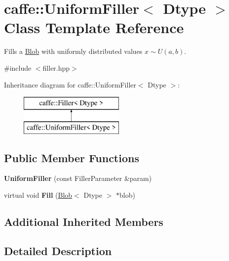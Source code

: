 \hypertarget{classcaffe_1_1UniformFiller}{}\section{caffe\+:\+:Uniform\+Filler$<$ Dtype $>$ Class Template Reference}
\label{classcaffe_1_1UniformFiller}


Fills a \hyperlink{classcaffe_1_1Blob}{Blob} with uniformly distributed values $ x\sim U(a, b) $.  




{\ttfamily \#include $<$filler.\+hpp$>$}

Inheritance diagram for caffe\+:\+:Uniform\+Filler$<$ Dtype $>$\+:\begin{figure}[H]
\begin{center}
\leavevmode
\includegraphics[height=2.000000cm]{classcaffe_1_1UniformFiller}
\end{center}
\end{figure}
\subsection*{Public Member Functions}
\begin{DoxyCompactItemize}
\item 
{\bfseries Uniform\+Filler} (const Filler\+Parameter \&param)\hypertarget{classcaffe_1_1UniformFiller_a54ba034191d145314cf44d158c14195a}{}\label{classcaffe_1_1UniformFiller_a54ba034191d145314cf44d158c14195a}

\item 
virtual void {\bfseries Fill} (\hyperlink{classcaffe_1_1Blob}{Blob}$<$ Dtype $>$ $\ast$blob)\hypertarget{classcaffe_1_1UniformFiller_ae874946013d1b9ec4ede19786da34a9d}{}\label{classcaffe_1_1UniformFiller_ae874946013d1b9ec4ede19786da34a9d}

\end{DoxyCompactItemize}
\subsection*{Additional Inherited Members}


\subsection{Detailed Description}
